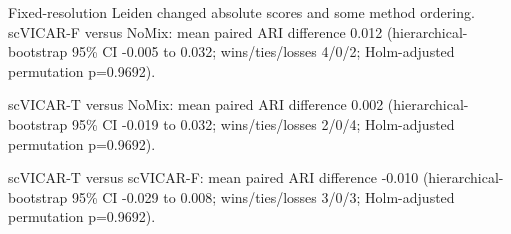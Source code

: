 

Fixed-resolution Leiden changed absolute scores and some method ordering. scVICAR-F versus NoMix: mean paired ARI difference 0.012 (hierarchical-bootstrap 95\% CI -0.005 to 0.032; wins/ties/losses 4/0/2; Holm-adjusted permutation p=0.9692).

scVICAR-T versus NoMix: mean paired ARI difference 0.002 (hierarchical-bootstrap 95\% CI -0.019 to 0.032; wins/ties/losses 2/0/4; Holm-adjusted permutation p=0.9692).

scVICAR-T versus scVICAR-F: mean paired ARI difference -0.010 (hierarchical-bootstrap 95\% CI -0.029 to 0.008; wins/ties/losses 3/0/3; Holm-adjusted permutation p=0.9692).
